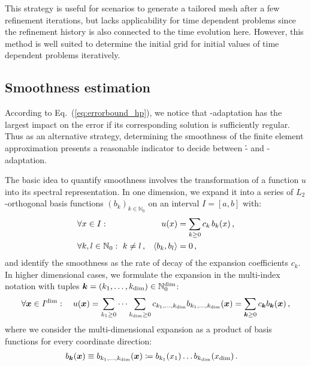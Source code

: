 This strategy is useful for scenarios to generate a tailored mesh after a few refinement iterations, but lacks applicability for time dependent problems since the refinement history is also connected to the time evolution here. However, this method is well suited to determine the initial grid for initial values of time dependent problems iteratively.



\subsection{Smoothness estimation}
\label{ssec:smoothness}

According to Eq.~(\ref{eq:errorbound_hp}), we notice that \p-adaptation has the largest impact on the error if its corresponding solution is sufficiently regular. Thus as an alternative strategy, determining the smoothness of the finite element approximation presents a reasonable indicator to decide between \h- and \p-adaptation.

The basic idea to quantify smoothness involves the transformation of a function $u$ into its spectral representation. In one dimension, we expand it into a series of $L_2$-orthogonal basis functions $(b_k)_{k\in\mathbb{N}_0}$ on an interval $I = [a,b]$ with:
\begin{align}
\hspace{7ex} & \forall x \in I : & u(x) &= \sum\limits_{k \geq 0} c_k \, b_k(x) \,\text{,} \hspace{7ex} \\
&\forall k,l \in \mathbb{N}_0 : ~ k \neq l \,\text{,} & \langle b_k, b_l \rangle &= 0 \,\text{,}
\end{align}
and identify the smoothness as the rate of decay of the expansion coefficients $c_k$. In higher dimensional cases, we formulate the expansion in the multi-index notation with tuples $\tuple{k} = (k_1, \dots, k_\text{dim}) \in \mathbb{N}_0^\text{dim}$:
\begin{align}
\forall \vec{x} \in I^\text{dim} : \quad u(\vec{x}) = \sum\limits_{k_1 \geq 0} \dots \sum\limits_{k_\text{dim} \geq 0} c_{k_1, \dots, k_{\text{dim}}} b_{k_1, \dots, k_{\text{dim}}}(\vec{x}) = \sum_{\tuple{k} \geq 0} c_\tuple{k} b_\tuple{k}(\vec{x}) \,\text{,}
\end{align}
where we consider the multi-dimensional expansion as a product of basis functions for every coordinate direction:
\begin{align}
\label{eq:spectral_multi} b_{\tuple{k}}(\vec{x}) \equiv b_{k_1, \dots, k_{\text{dim}}}(\vec{x}) &\coloneqq b_{k_1}(x_1) \ldots b_{k_\text{dim}}(x_\text{dim}) \,\text{.}
\end{align}

